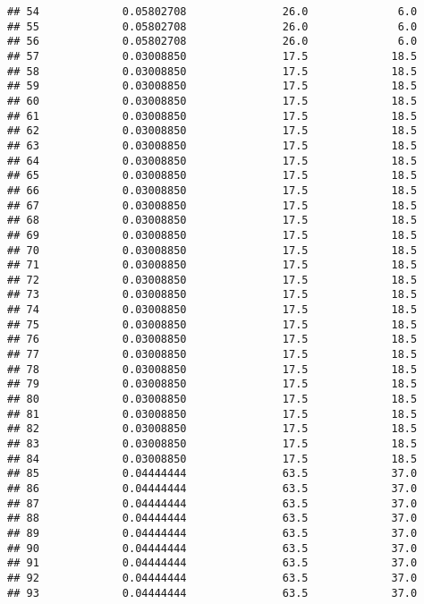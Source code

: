\documentclass[]{article}
\begin{document}
\begin{verbatim}
## 54             0.05802708               26.0              6.0
## 55             0.05802708               26.0              6.0
## 56             0.05802708               26.0              6.0
## 57             0.03008850               17.5             18.5
## 58             0.03008850               17.5             18.5
## 59             0.03008850               17.5             18.5
## 60             0.03008850               17.5             18.5
## 61             0.03008850               17.5             18.5
## 62             0.03008850               17.5             18.5
## 63             0.03008850               17.5             18.5
## 64             0.03008850               17.5             18.5
## 65             0.03008850               17.5             18.5
## 66             0.03008850               17.5             18.5
## 67             0.03008850               17.5             18.5
## 68             0.03008850               17.5             18.5
## 69             0.03008850               17.5             18.5
## 70             0.03008850               17.5             18.5
## 71             0.03008850               17.5             18.5
## 72             0.03008850               17.5             18.5
## 73             0.03008850               17.5             18.5
## 74             0.03008850               17.5             18.5
## 75             0.03008850               17.5             18.5
## 76             0.03008850               17.5             18.5
## 77             0.03008850               17.5             18.5
## 78             0.03008850               17.5             18.5
## 79             0.03008850               17.5             18.5
## 80             0.03008850               17.5             18.5
## 81             0.03008850               17.5             18.5
## 82             0.03008850               17.5             18.5
## 83             0.03008850               17.5             18.5
## 84             0.03008850               17.5             18.5
## 85             0.04444444               63.5             37.0
## 86             0.04444444               63.5             37.0
## 87             0.04444444               63.5             37.0
## 88             0.04444444               63.5             37.0
## 89             0.04444444               63.5             37.0
## 90             0.04444444               63.5             37.0
## 91             0.04444444               63.5             37.0
## 92             0.04444444               63.5             37.0
## 93             0.04444444               63.5             37.0

\end{verbatim}
\end{document}
